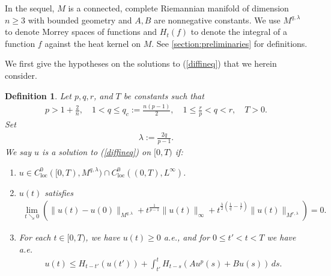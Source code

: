 \documentclass[12pt]{amsart}
\renewcommand{\1}{{\mathbf 1}}
\theoremstyle{others}
\numberwithin{equation}{section}
\newtheorem{definition}[thm]{Definition}
\begin{document}
In the sequel, \(M\) is a connected, complete %
Riemannian manifold of dimension \(n \geq 3\) with bounded geometry and \(A,B\) are nonnegative constants. We use \(M^{q, \lambda}\) to denote Morrey spaces of functions and \(H_t(f)\) to denote the integral of a function \(f\) against the heat kernel on %
\(M\). %
See \textsection \ref{section:preliminaries} for definitions. \par 
We first give the hypotheses on the solutions to (\ref{diffineq}) that we herein consider.
\begin{definition}\label{defn:weaksolution}
        Let \(p, q, r\), and \(T\) be constants such that
        \begin{align*}
            p > 1 + \frac{2}{n}, \quad 1 < q \leq q_c := \frac{n(p-1)}{2}, \quad 1 \leq \frac{r}{p} < q < r, \quad T > 0.
        \end{align*}Set
        \begin{align*}
            \lambda := \frac{2q}{p-1}.
        \end{align*} We say \(u\) is a solution to (\ref{diffineq}) on \([0, T)\) if:
        \begin{enumerate}
            \item \(u \in C_{\text{loc}}^0([0, T), M^{q, \lambda}) \cap C_{\text{loc}}^0((0, T), L^\infty)\). 
            \item \(u(t)\) satisfies 
        \begin{align*}
            \lim_{t \searrow 0} \left(\|u(t) - u(0)\|_{M^{q, \lambda}} + t^{\frac{1}{p-1}} \|u(t)\|_\infty + t^{\frac{\lambda}{2}\left(\frac{1}{q} - \frac{1}{r}\right)}\|u(t)\|_{M^{r, \lambda}}\right)  = 0.
        \end{align*}
        \item For each \(t \in [0, T)\), we have \(u(t) \geq 0\) a.e., and for \(0 \leq t' < t < T\) we have a.e.
        \begin{align}\label{weaksolution:subsolution}
            u(t) \leq H_{t-t'}(u(t')) + \int_{t'}^t H_{t-s}(Au^p(s) + Bu(s)) \, ds.
        \end{align}
        \end{enumerate}
    \end{definition}
\end{document}
